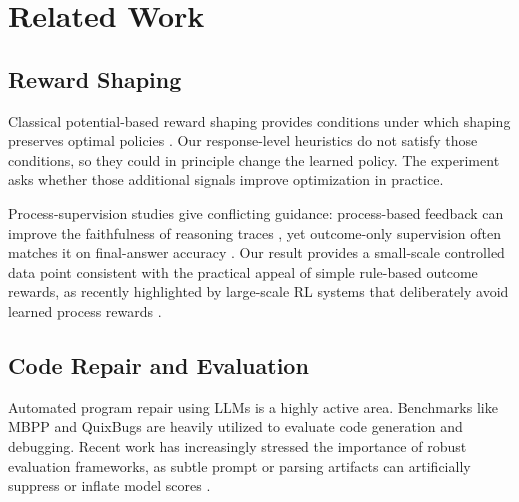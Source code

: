 \documentclass{article}
\begin{document}
\section{Related Work}

\subsection{Reward Shaping}
Classical potential-based reward shaping provides conditions under which shaping preserves optimal policies \cite{Ng1999}. Our response-level heuristics do not satisfy those conditions, so they could in principle change the learned policy. The experiment asks whether those additional signals improve optimization in practice.

Process-supervision studies give conflicting guidance: process-based feedback can improve the faithfulness of reasoning traces \cite{Lightman2023}, yet outcome-only supervision often matches it on final-answer accuracy \cite{Uesato2022}. Our result provides a small-scale controlled data point consistent with the practical appeal of simple rule-based outcome rewards, as recently highlighted by large-scale RL systems that deliberately avoid learned process rewards \cite{Guo2025}.

\subsection{Code Repair and Evaluation}
Automated program repair using LLMs is a highly active area. Benchmarks like MBPP and QuixBugs \cite{Lin2017} are heavily utilized to evaluate code generation and debugging. Recent work has increasingly stressed the importance of robust evaluation frameworks, as subtle prompt or parsing artifacts can artificially suppress or inflate model scores \cite{Tian2024, Tam2024}.
\end{document}
